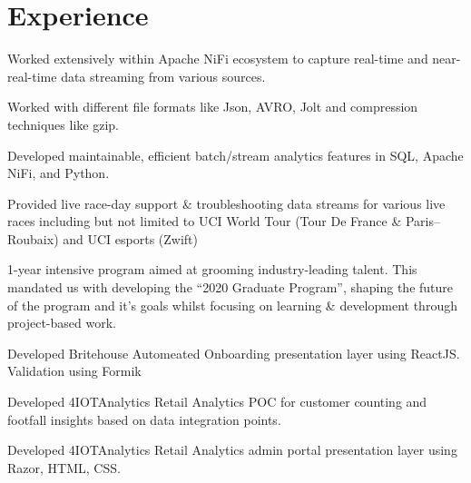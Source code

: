 \documentclass[]{deedy-resume-openfont}
\begin{document}
\begin{minipage}[t]{0.66\textwidth}
\section{Experience}
\vspace{\topsep} %
\begin{tightemize}
\item Worked extensively within Apache NiFi ecosystem to capture real-time and near-real-time data streaming from various sources.
\item Worked with different file formats like Json, AVRO, Jolt and compression techniques like gzip. 
\item Developed maintainable, efficient batch/stream analytics features in SQL, Apache NiFi, and Python. 
\item Provided live race-day support \& troubleshooting data streams for various live races including but not limited to UCI World Tour (Tour De France \& Paris–Roubaix) and UCI esports (Zwift)
\end{tightemize}
\sectionsep

\vspace{\topsep} %
\begin{tightemize}
\item 1-year intensive program aimed at grooming industry-leading talent. This mandated us with developing the “2020 Graduate Program”, shaping the future of the program and it's goals whilst focusing on learning \& development through project-based work.
\item Developed Britehouse Automeated Onboarding presentation layer using ReactJS. Validation using Formik
\item Developed 4IOTAnalytics Retail Analytics POC for customer counting and footfall insights based on data integration points.
\item Developed 4IOTAnalytics Retail Analytics admin portal presentation layer using Razor, HTML, CSS.
\end{tightemize}
\sectionsep



\end{minipage}
\end{document}
